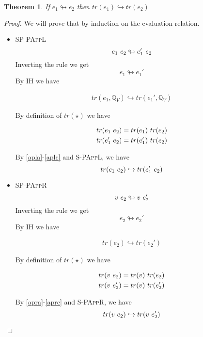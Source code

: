 \documentclass[10pt,a4paper]{article}
\newtheorem{theorem}{Theorem}
\newcommand\trans[1]{\ensuremath{tr (#1)}}
\newcommand\rulename[1]{\textsc{#1}}
\newcommand\peval[2]{\ensuremath{#1 \looparrowright #2 }}
\newcommand\eval[2]{\ensuremath{#1 \hookrightarrow #2 }}
\newcommand\qv{\ensuremath{\mathbb{Q}_V}}
\begin{document}
\begin{comment}
\begin{theorem}
If ${\Gamma}\Vdash {e}:{S}$
then $ {\Gamma} \vdash {\trans{e}} : {\trans{S}}$
\end{theorem}
\end{comment}
\begin{theorem}
If $e_1 \looparrowright e_2 $
then $ \trans{e_1} \hookrightarrow \trans{e_2} $
\end{theorem}
\begin{proof}
We will prove that by induction on the evaluation relation.
\begin{itemize}
\item \rulename{SP-PAppL} $$\peval{\eapp{e_1}{e_2}}{\eapp{e_1'}{e_2}}$$
Inverting the rule we get $$ \peval{e_1}{e_1'} $$ 
By IH we have 

\begin{align}
\eval{\trans{e_1, \qv}}{\trans{e_1', \qv}} \label{apla}
\end{align}

By definition of \trans{\star} we have 

\begin{align}
\trans{\eapp{e_1}{e_2}} = \eapp{\trans{e_1}}{\trans{e_2}} \label{aplb}\\
\trans{\eapp{e_1'}{e_2}} = \eapp{\trans{e_1'}}{\trans{e_2}} \label{aplc}
\end{align}

By \ref{apla}-\ref{aplc} and \rulename{S-PAppL}, we have 
$$ \eval{\trans{\eapp{e_1}{e_2}}}{\trans{\eapp{e_1'}{e_2}}} \label{apla} $$

\item \rulename{SP-PAppR} $$\peval{\eapp{v}{e_2}}{\eapp{v}{e_2'}}$$
Inverting the rule we get $$ \peval{e_2}{e_2'} $$ 
By IH we have 

\begin{align}
\eval{\trans{e_2}}{\trans{e_2'}} \label{apra}
\end{align}

By definition of \trans{\star} we have 

\begin{align}
\trans{\eapp{v}{e_2}} = \eapp{\trans{v}}{\trans{e_2}} \label{aprb}\\
\trans{\eapp{v}{e_2'}} = \eapp{\trans{v}}{\trans{e_2'}} \label{aprc}
\end{align}

By \ref{apra}-\ref{aprc} and \rulename{S-PAppR}, we have 
$$ \eval{\trans{\eapp{v}{e_2}}}{\trans{\eapp{v}{e_2'}}} \label{apla} $$


\end{itemize}
\end{proof}
\end{document}

